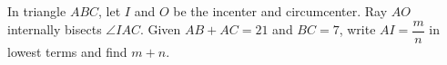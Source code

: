 In triangle $ABC$, let $I$ and $O$ be the incenter and circumcenter. Ray $AO$ internally bisects $\angle IAC$. Given $AB+AC=21$ and $BC=7$, write $AI=\dfrac{m}{n}$ in lowest terms and find $m+n$.
